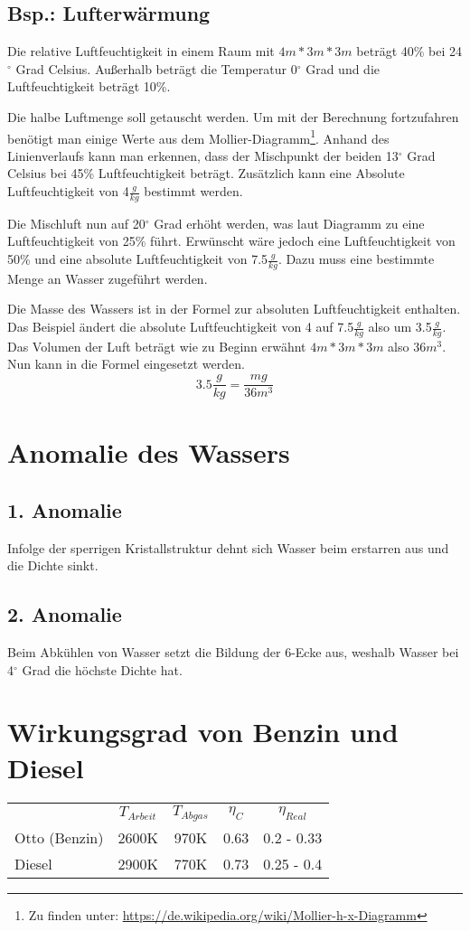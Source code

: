 \documentclass[a4paper,12pt]{article}
\begin{document}
\subsection{Bsp.: Lufterwärmung}
Die relative Luftfeuchtigkeit in einem Raum mit $4m * 3m * 3m$ beträgt 40\% bei 24$^\circ$ Grad Celsius. Außerhalb beträgt die Temperatur 0$^\circ$ Grad und die Luftfeuchtigkeit beträgt 10\%.

Die halbe Luftmenge soll getauscht werden. Um mit der Berechnung fortzufahren benötigt man einige Werte aus dem Mollier-Diagramm\footnote{Zu finden unter: \href{https://de.wikipedia.org/wiki/Mollier-h-x-Diagramm}{https://de.wikipedia.org/wiki/Mollier-h-x-Diagramm}}.
Anhand des Linienverlaufs kann man erkennen, dass der Mischpunkt der beiden 13$^\circ$ Grad Celsius bei 45\% Luftfeuchtigkeit beträgt. Zusätzlich kann eine Absolute Luftfeuchtigkeit von 4$\frac{g}{kg}$ bestimmt werden.

Die Mischluft nun auf 20$^\circ$ Grad erhöht werden, was laut Diagramm zu eine Luftfeuchtigkeit von 25\% führt. Erwünscht wäre jedoch eine Luftfeuchtigkeit von 50\% und eine absolute Luftfeuchtigkeit von 7.5$\frac{g}{kg}$.
Dazu muss eine bestimmte Menge an Wasser zugeführt werden.

Die Masse des Wassers ist in der Formel zur absoluten Luftfeuchtigkeit enthalten. Das Beispiel ändert die absolute Luftfeuchtigkeit von 4 auf 7.5$\frac{g}{kg}$ also um 3.5$\frac{g}{kg}$. 
Das Volumen der Luft beträgt wie zu Beginn erwähnt $4m * 3m * 3m$ also $36m^3$. Nun kann in die Formel eingesetzt werden.
$$3.5\frac{g}{kg} = \frac{m g}{36m^3}$$

\section{Anomalie des Wassers}
\subsection{1. Anomalie}
Infolge der sperrigen Kristallstruktur dehnt sich Wasser beim erstarren aus und die Dichte sinkt.
\subsection{2. Anomalie}
Beim Abkühlen von Wasser setzt die Bildung der 6-Ecke aus, weshalb Wasser bei 4$^\circ$ Grad die höchste Dichte hat.

\section{Wirkungsgrad von Benzin und Diesel}
\begin{tabular}{l c c c c}
 & $T_{Arbeit}$ & $T_{Abgas}$ & $\eta_C$ & $\eta_{Real}$\\
 Otto (Benzin) & 2600K & 970K & 0.63 & 0.2 - 0.33\\
 Diesel & 2900K & 770K & 0.73 & 0.25 - 0.4
\end{tabular}
\end{document}

